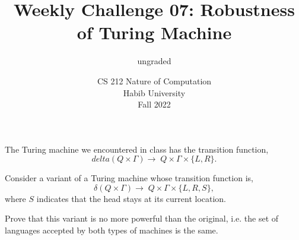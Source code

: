 \documentclass[a4paper]{exam}
\title{Weekly Challenge 07: Robustness of Turing Machine}
\author{ungraded} %
\date{CS 212 Nature of Computation\\Habib University\\Fall 2022}
\begin{document}
\maketitle

\begin{questions}
  

  The Turing machine we encountered in class has the transition function,
  \[
    delta(Q\times\Gamma)\to\; Q\times\Gamma\times\{L,R\}.
  \]

  Consider a variant of a Turing machine whose transition function is,
  \[
    \delta(Q\times\Gamma)\to\; Q\times\Gamma\times\{L,R, S\},
  \]
  where $S$ indicates that the head stays at its current location.

  Prove that this variant is no more powerful than the original, i.e. the set of languages accepted by both types of machines is the same.
  
  \begin{solution}
  \end{solution}
\end{questions}
\end{document}
